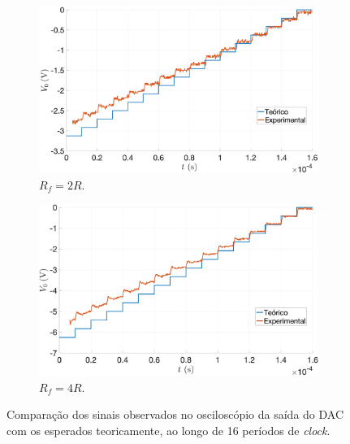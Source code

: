 \documentclass[a4paper, oneside]{article}
\begin{document}
\begin{figure}[ht]
	\centering
	\begin{subfigure}[b]{0.5\textwidth}
		\centering
		\includegraphics[width=\textwidth]{figures/4_3_2_DAC_2R.png}
		\caption{$R_f=2R$.\\}
		\label{fig:4_3_2_DAC_2R}
	\end{subfigure}%
	\hfill
	\begin{subfigure}[b]{0.5\textwidth}
		\centering
		\includegraphics[width=\textwidth]{figures/4_3_2_DAC_4R.png}
		\caption{$R_f=4R$.\\}
		\label{fig:4_3_2_DAC_4R}
	\end{subfigure}%
	\caption{Comparação dos sinais observados no osciloscópio da saída do DAC com os esperados teoricamente, ao longo de 16 períodos de \textit{clock}.\\}
	\label{fig:DAC_exp_cmp}
\end{figure}
\end{document}
